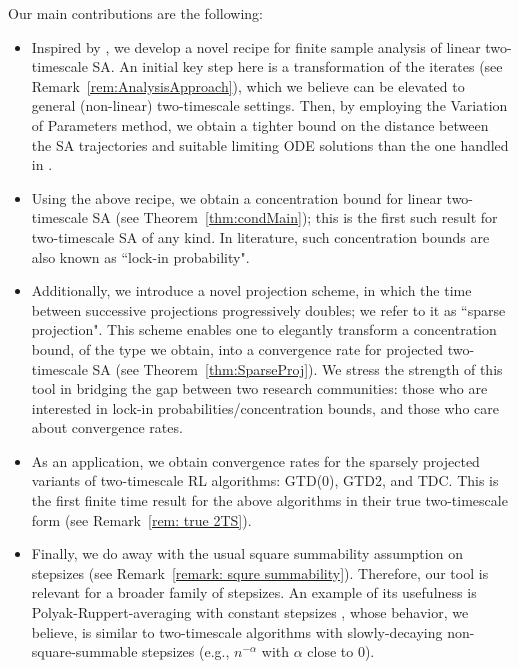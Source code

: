\documentclass[usenames,dvipsnames,final,12pt]{colt2018} %
\newcommand{\gal}[1]{#1}
\newcommand{\gugan}[1]{#1}
\begin{document}
Our main contributions are the following:
\begin{itemize}

\item \gugan{Inspired by \citep{borkar2008stochastic}, we develop a novel recipe for finite sample analysis of linear two-timescale SA. An initial key step here is a transformation of the iterates (see Remark~\ref{rem:AnalysisApproach}), which we believe can be elevated to general (non-linear) two-timescale settings. Then, by employing the Variation of Parameters method, we obtain a tighter bound on the distance between the SA trajectories and suitable limiting ODE solutions than the one handled in \citep{borkar2008stochastic}.  %
    }

\item \gugan{Using the above recipe, we obtain a concentration bound for linear two-timescale SA (see Theorem~\ref{thm:condMain}); this is the first such result for two-timescale SA of any kind. In literature, such concentration bounds are also known as ``lock-in probability".}

\item \gugan{Additionally, we introduce a novel projection scheme, in which the time between successive projections progressively doubles\gal{; w}e refer to \gal{it} as ``sparse projection". This scheme enables one to elegantly transform a concentration bound, of the type we obtain, into a \gal{convergence} rate for projected two-timescale SA (see Theorem~\ref{thm:SparseProj}). We stress the strength of this tool in bridging the gap between two research communities\gal{:} those who are interested in lock-in probabilities/concentration bounds\gal{,} and those who care about convergence rates.}

\item \gugan{As an application, we obtain convergence rates for the sparsely projected variants of two-timescale RL algorithms: GTD(0), GTD2, and TDC. This is the first finite time result} for the above algorithms in their true two-timescale form (see Remark~\ref{rem: true 2TS}).

\item Finally, we do away with the usual square summability assumption on stepsizes (see Remark~\ref{remark: squre summability}). Therefore, our tool is relevant for a broader family of stepsizes. An example of its usefulness is Polyak-Ruppert-averaging with constant stepsizes \citep{defossez2014constant,lakshminarayanan2018linear}, whose behavior, we believe, is similar to two-timescale algorithms with slowly-decaying non-square-summable stepsizes (e.g., $n^{-\alpha}$ with $\alpha$ close to 0).






\end{itemize}
\end{document}
